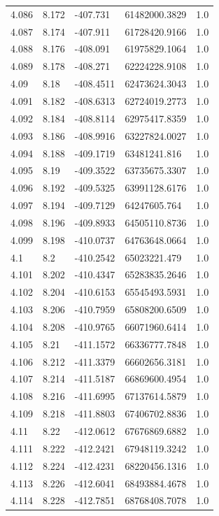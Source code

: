 \begin{tabular}{lllll}
4.086 & 8.172 & -407.731 & 61482000.3829 & 1.0 \\
4.087 & 8.174 & -407.911 & 61728420.9166 & 1.0 \\
4.088 & 8.176 & -408.091 & 61975829.1064 & 1.0 \\
4.089 & 8.178 & -408.271 & 62224228.9108 & 1.0 \\
4.09 & 8.18 & -408.4511 & 62473624.3043 & 1.0 \\
4.091 & 8.182 & -408.6313 & 62724019.2773 & 1.0 \\
4.092 & 8.184 & -408.8114 & 62975417.8359 & 1.0 \\
4.093 & 8.186 & -408.9916 & 63227824.0027 & 1.0 \\
4.094 & 8.188 & -409.1719 & 63481241.816 & 1.0 \\
4.095 & 8.19 & -409.3522 & 63735675.3307 & 1.0 \\
4.096 & 8.192 & -409.5325 & 63991128.6176 & 1.0 \\
4.097 & 8.194 & -409.7129 & 64247605.764 & 1.0 \\
4.098 & 8.196 & -409.8933 & 64505110.8736 & 1.0 \\
4.099 & 8.198 & -410.0737 & 64763648.0664 & 1.0 \\
4.1 & 8.2 & -410.2542 & 65023221.479 & 1.0 \\
4.101 & 8.202 & -410.4347 & 65283835.2646 & 1.0 \\
4.102 & 8.204 & -410.6153 & 65545493.5931 & 1.0 \\
4.103 & 8.206 & -410.7959 & 65808200.6509 & 1.0 \\
4.104 & 8.208 & -410.9765 & 66071960.6414 & 1.0 \\
4.105 & 8.21 & -411.1572 & 66336777.7848 & 1.0 \\
4.106 & 8.212 & -411.3379 & 66602656.3181 & 1.0 \\
4.107 & 8.214 & -411.5187 & 66869600.4954 & 1.0 \\
4.108 & 8.216 & -411.6995 & 67137614.5879 & 1.0 \\
4.109 & 8.218 & -411.8803 & 67406702.8836 & 1.0 \\
4.11 & 8.22 & -412.0612 & 67676869.6882 & 1.0 \\
4.111 & 8.222 & -412.2421 & 67948119.3242 & 1.0 \\
4.112 & 8.224 & -412.4231 & 68220456.1316 & 1.0 \\
4.113 & 8.226 & -412.6041 & 68493884.4678 & 1.0 \\
4.114 & 8.228 & -412.7851 & 68768408.7078 & 1.0 \\

\end{tabular}
